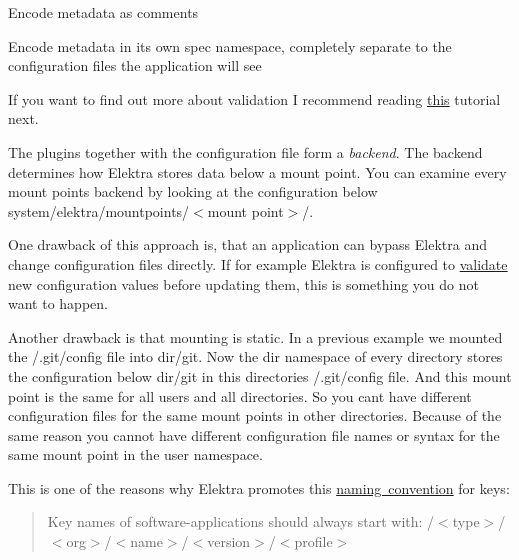 \begin{DoxyEnumerate}
\item Encode metadata as comments
\item Encode metadata in its own {\ttfamily spec} namespace, completely separate to the configuration files the application will see
\end{DoxyEnumerate}

If you want to find out more about validation I recommend reading \mbox{\hyperlink{validation.md_doc_tutorials_validation_md}{this}} tutorial next.

The plugins together with the configuration file form a {\itshape backend}. The backend determines how Elektra stores data below a mount point. You can examine every mount points backend by looking at the configuration below {\ttfamily system/elektra/mountpoints/$<$mount point$>$/}.

One drawback of this approach is, that an application can bypass Elektra and change configuration files directly. If for example Elektra is configured to \mbox{\hyperlink{validation.md_doc_tutorials_validation_md}{validate}} new configuration values before updating them, this is something you do not want to happen.

Another drawback is that mounting is static. In a previous example we mounted the {\ttfamily /.git/config} file into {\ttfamily dir/git}. Now the {\ttfamily dir} namespace of every directory stores the configuration below {\ttfamily dir/git} in this directories {\ttfamily /.git/config} file. And this mount point is the same for all users and all directories. So you can\textquotesingle{}t have different configuration files for the same mount points in other directories. Because of the same reason you cannot have different configuration file names or syntax for the same mount point in the {\ttfamily user} namespace.

This is one of the reasons why Elektra promotes this \mbox{\hyperlink{doc_help_elektra-key-names_md}{naming convention}} for keys\+:

\begin{quote}
Key names of software-\/applications should always start with\+: {\ttfamily /$<$type$>$/$<$org$>$/$<$name$>$/$<$version$>$/$<$profile$>$} \end{quote}


